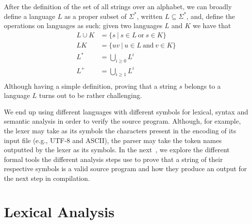 \documentclass[
  oneside,
  english,
  coorientadorbanca,
  noabntexcite
]{ufsc-thesis-rn46-2019}
\begin{document}
After the definition of the set of all strings over an alphabet, we can broadly define a language $L$ as a proper subset of $\Sigma^*$, written $L \subseteq \Sigma^*$, and, define the operations on languages as such: given two languages $L$ and $K$ we have that
\begin{align*}
  L \cup K & = \{ s\ |\ s \in L\ \text{or}\ s \in K \}   \\
  L K      & = \{ uv\ |\ u \in L\ \text{and}\ v \in K \} \\
  L^*      & = \bigcup_{i \geq 0} L^{i}                  \\
  L^+      & = \bigcup_{i \geq 1} L^{i}                  \\
\end{align*}
Although having a simple definition, proving that a string $s$ belongs to a language $L$ turns out to be rather challenging.

We end up using different languages with different symbols for lexical, syntax and semantic analysis in order to verify the source program.
Although, for example, the lexer may take as its symbols the characters present in the encoding of its input file (e.g., UTF-8 and ASCII), the parser may take the token names outputted by the lexer as its symbols.
In the next~, we explore the different formal tools the different analysis steps use to prove that a string of their respective symbols is a valid source program and how they produce an output for the next step in compilation.

\section{Lexical Analysis}\label{chapter:background:sec:lexical}
\end{document}
